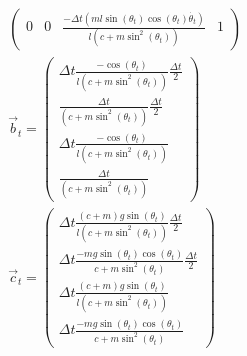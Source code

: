 \begin{solution}[print=false]
\begin{align*}
\begin{pmatrix}
0 & 0 & \frac{- \Delta t (m l \sin(\theta_t) \cos(\theta_t) \dot{\theta_t})}{l (c+m \sin^2(\theta_t))}  & 1
\end{pmatrix}\\
\vec b_t = \begin{pmatrix}
\Delta t \frac{-\cos(\theta_t)}{l(c+m \sin^2(\theta_t))} \frac{\Delta t}{2}\\
\frac{\Delta t} {(c+m \sin^2(\theta_t))} \frac{\Delta t}{2}\\
\Delta t \frac{-\cos(\theta_t)}{l(c+m \sin^2(\theta_t))}\\
\frac{\Delta t} {(c+m \sin^2(\theta_t))}
\end{pmatrix}\\
\vec{c}_t = 
\begin{pmatrix}
\Delta t \frac{(c+m) g \sin(\theta_t)}{l (c+m \sin^2(\theta_t))} \frac{\Delta t}{2}\\
\Delta t \frac{-m g \sin(\theta_t) \cos(\theta_t)}{c+m \sin^2(\theta_t)} \frac{\Delta t}{2}\\
\Delta t \frac{(c+m) g \sin(\theta_t)}{l (c+m \sin^2(\theta_t))}\\
\Delta t \frac{-m g \sin(\theta_t) \cos(\theta_t)}{c+m \sin^2(\theta_t)}
\end{pmatrix}
\end{align*}
\end{solution}

